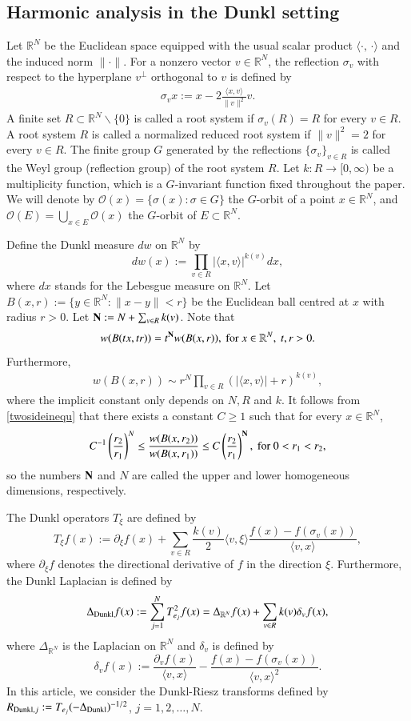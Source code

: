 \documentclass[12pt]{amsart}
\begin{document}
\subsection{Harmonic analysis in the Dunkl setting}
Let $\mathbb{R}^N$ be the Euclidean space equipped with the usual scalar product $\langle \cdot,\,\cdot\rangle $ and the induced norm $\|\cdot\|$. For a nonzero vector $v\in \mathbb{R}^N$, the reflection $\sigma_v$ with respect to the hyperplane $v^{\perp}$ orthogonal to $v$ is defined by
\begin{align*}
	\sigma_v x:= x-2\frac{\langle x,v\rangle}{\|v\|^2}v.
\end{align*}
A finite set $R\subset \mathbb{R}^N\backslash \{0\}$ is called a root system if $\sigma_v(R)=R$ for every $v\in R$. A root system $R$ is called a normalized reduced root system if  $\|v\|^2=2$ for every $v\in R$.
The finite group $G$ generated by the reflections $\{\sigma_v\}_{v\in R}$ is called the Weyl group (reflection group) of the root system $R$.
Let $k: R \to [0,\infty)$ be a multiplicity function, which is a $G$-invariant function  fixed throughout the paper. We will denote by $\mathcal O(x)=\{\sigma(x): \sigma \in G\}$ the $G$-orbit of a point $x\in\mathbb{R}^N$, and $\mathcal O(E)=\bigcup_{x \in E} \mathcal O(x)$ the $G$-orbit of $E\subset \mathbb{R}^N$.

Define the Dunkl measure $dw$ on $\mathbb{R}^N$ by
$$
dw(x) :=\prod_{v \in R} |\langle x,v\rangle|^{k(v)} dx,
$$
where $dx$ stands for the Lebesgue measure on $\mathbb{R}^N$. Let $B(x,r):=\{y\in \mathbb{R}^N:\|x-y\|< r\}$ be the Euclidean ball centred at $x$ with radius $r>0$. Let ${\bf N}:=N+\sum_{v\in R}k(v)$. Note that
$$w(B(tx,tr))=t^{{\bf N}}w(B(x,r)),\ {\rm for}\ x\in\mathbb{R}^N,\ t,r>0.$$
Furthermore,
\begin{align}\label{twosideinequ}
  w(B(x,r))\sim r^N \prod_{v \in R}(|\langle x, v \rangle |+r)^{k(v)},
\end{align}
where the implicit constant only depends on $N,R$ and $k$.  It follows from \eqref{twosideinequ} that there exists a constant $C\geq 1$ such that for every $x\in \mathbb{R}^N$,
\begin{align}\label{doublinginequality}
C^{-1}\left(\frac{r_2}{r_1}\right)^N\leq \frac{w(B(x,r_2))}{w(B(x,r_1))}\leq C\left(\frac{r_2}{r_1}\right)^\N,\ {\rm for}\ 0<r_1<r_2,
\end{align}
so the numbers ${\bf N}$ and $N$ are called the upper and lower homogeneous dimensions, respectively.

The Dunkl operators $T_\xi$ are defined by
$$T_\xi f(x):=\partial_\xi f(x)+\sum_{v\in R}\frac{k(v)}{2}\langle v,\xi\rangle\frac{f(x)-f(\sigma_v(x))}{\langle v,x\rangle},$$
where $\partial_\xi f$ denotes the directional derivative of $f$ in the direction $\xi$. Furthermore, the Dunkl Laplacian is defined by $$\Delta_{{\rm Dunkl}}f(x):=\sum_{j=1}^N T_{e_j}^2f(x)=\Delta_{\mathbb{R}^N}f(x)+\sum_{v\in R}k(v)\delta_v f(x),$$
where $\Delta_{\mathbb{R}^N}$ is the Laplacian on $\mathbb{R}^N$ and $\delta_v$ is defined by
$$\delta_v f(x):=\frac{\partial_v f(x)}{\langle v,x\rangle}-\frac{f(x)-f(\sigma_v(x))}{\langle v,x\rangle^2}.$$
In this article, we consider the Dunkl-Riesz transforms defined by $R_{{\rm Dunkl},j}:=T_{e_j}(-\Delta_{{\rm Dunkl}})^{-1/2}$, $j=1,2,\ldots,N$.
\end{document}
